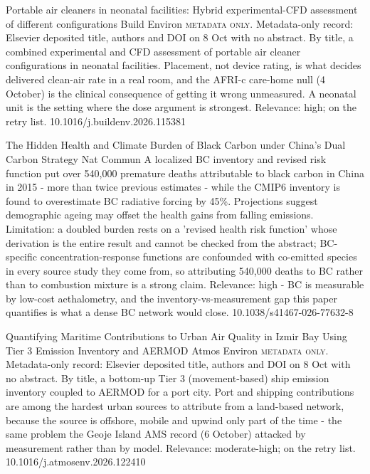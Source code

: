 \documentclass[10pt]{article}
\begin{document}
\par{}\baselineskip{}\baselineskip
{}

{Portable air cleaners in neonatal facilities: Hybrid experimental-CFD assessment of different configurations}
{Build Environ}
{\textsc{metadata only.} Metadata-only record: Elsevier deposited title, authors and DOI on 8 Oct with no abstract. By title, a combined experimental and CFD assessment of portable air cleaner configurations in neonatal facilities. Placement, not device rating, is what decides delivered clean-air rate in a real room, and the AFRI-c care-home null (4 October) is the clinical consequence of getting it wrong unmeasured. A neonatal unit is the setting where the dose argument is strongest. Relevance: high; on the retry list.}
{10.1016/j.buildenv.2026.115381}

\par{}\baselineskip{}\baselineskip
{}

{The Hidden Health and Climate Burden of Black Carbon under China's Dual Carbon Strategy}
{Nat Commun}
{A localized BC inventory and revised risk function put over 540,000 premature deaths attributable to black carbon in China in 2015 - more than twice previous estimates - while the CMIP6 inventory is found to overestimate BC radiative forcing by 45\%. Projections suggest demographic ageing may offset the health gains from falling emissions. Limitation: a doubled burden rests on a 'revised health risk function' whose derivation is the entire result and cannot be checked from the abstract; BC-specific concentration-response functions are confounded with co-emitted species in every source study they come from, so attributing 540,000 deaths to BC rather than to combustion mixture is a strong claim. Relevance: high - BC is measurable by low-cost aethalometry, and the inventory-vs-measurement gap this paper quantifies is what a dense BC network would close.}
{10.1038/s41467-026-77632-8}

{Quantifying Maritime Contributions to Urban Air Quality in Izmir Bay Using Tier 3 Emission Inventory and AERMOD}
{Atmos Environ}
{\textsc{metadata only.} Metadata-only record: Elsevier deposited title, authors and DOI on 8 Oct with no abstract. By title, a bottom-up Tier 3 (movement-based) ship emission inventory coupled to AERMOD for a port city. Port and shipping contributions are among the hardest urban sources to attribute from a land-based network, because the source is offshore, mobile and upwind only part of the time - the same problem the Geoje Island AMS record (6 October) attacked by measurement rather than by model. Relevance: moderate-high; on the retry list.}
{10.1016/j.atmosenv.2026.122410}
\end{document}
